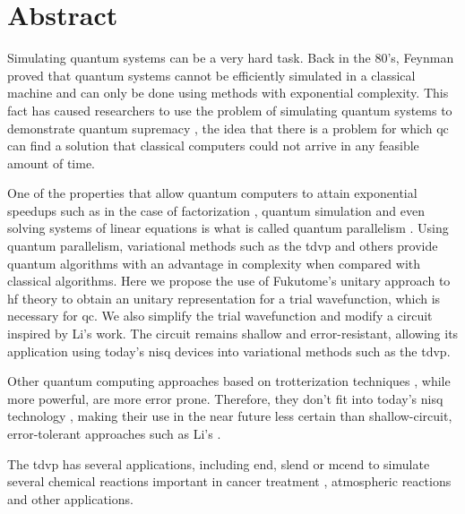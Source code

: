 \documentclass{aux/ttuthes2007}
\begin{document}
\chapter{\textbf{Abstract}}

Simulating quantum systems can be a very hard task. Back in the 80's, Feynman  proved that quantum systems cannot be efficiently simulated in a classical machine and can only be done using methods with exponential complexity. 
This fact has caused researchers to use the problem of simulating quantum systems to demonstrate quantum supremacy , the idea that there is a problem for which \gls{qc} can find a solution that classical computers could not arrive in any feasible amount of time.

One of the properties that allow quantum computers to attain exponential speedups such as in the case of factorization , quantum simulation  and even solving systems of linear equations  is what is called quantum parallelism .
Using quantum parallelism, variational methods such as the \gls{tdvp} and others  provide quantum algorithms with an advantage in complexity when compared with classical algorithms.
Here we propose the use of Fukutome's  unitary approach to \gls{hf} theory to obtain an unitary representation for a trial wavefunction, which is necessary for \gls{qc}.
We also simplify the trial wavefunction and modify a circuit inspired by Li's  work. The circuit remains shallow and error-resistant, allowing its application using today's \gls{nisq} devices into variational methods such as the \gls{tdvp}.

Other quantum computing approaches based on trotterization techniques , while more powerful, are more error prone. Therefore, they don't fit into today's \gls{nisq} technology , making their use in the near future less certain than shallow-circuit, error-tolerant approaches such as Li's .

The \gls{tdvp} has several applications, including \gls{end}, \gls{slend} or \gls{mcend} to simulate several chemical reactions important in cancer treatment , atmospheric reactions  and other applications.
\end{document}
